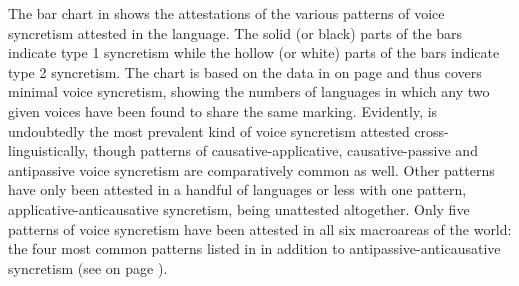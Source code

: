 \newpage

The bar chart in  shows the attestations of the various patterns of voice syncretism attested in the language. The solid (or black) parts of the bars indicate type 1 syncretism while the hollow (or white) parts of the bars indicate type 2 syncretism. The chart is based on the data in  on page \pageref{tab:ch6:voice-syncretism-simplex} and thus covers minimal voice syncretism, showing the numbers of languages in which any two given voices have been found to share the same marking. Evidently,  is undoubtedly the most prevalent kind of voice syncretism attested cross-linguistically, though patterns of causative-applicative, causative-passive and antipassive voice syncretism are comparatively common as well. Other patterns have only been attested in a handful of languages or less with one pattern, applicative-anticausative syncretism, being unattested altogether. Only five patterns of voice syncretism have been attested in all six macroareas of the world: the four most common patterns listed in  in addition to antipassive-anticausative syncretism (see  on page \pageref{tab:ch6:voice-syncretism-macroarea-minimal}).

